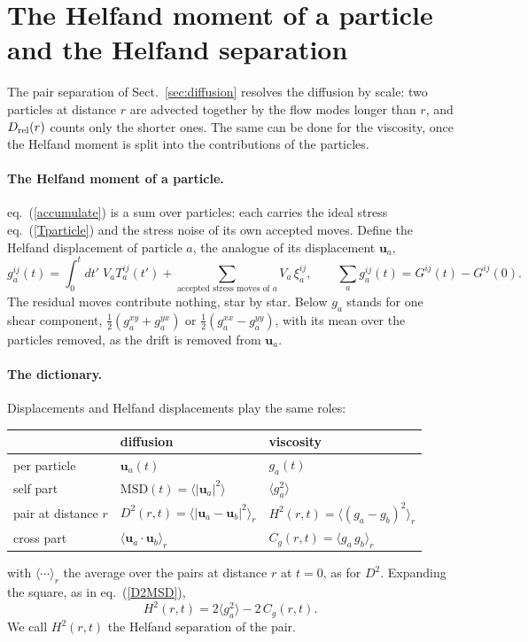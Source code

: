 \documentclass[11pt,aps,preprint,nofootinbib,superscriptaddress,tightenlines]{revtex4-2}
\def\st{\begin{equation}}
\def\stp{\end{equation}}
\def\Eq#1{eq.~(\ref{#1})}
\def\Sect#1{Sect.~\ref{#1}}
\newcommand{\avg}[1]{\langle #1\rangle}
\let\oldparagraph\paragraph
\renewcommand{\paragraph}{\par\bigskip\oldparagraph}
\begin{document}
\section{The Helfand moment of a particle and the Helfand separation}
\label{sec:hsep}

The pair separation of \Sect{sec:diffusion} resolves the diffusion by scale: two particles at distance $r$ are advected together by
the flow modes longer than $r$, and $D_{\rm rel}(r)$ counts only the shorter ones.  The same can be done for the viscosity, once the
Helfand moment is split into the contributions of the particles.

\paragraph{The Helfand moment of a particle.}  \Eq{accumulate} is a sum over particles: each carries the ideal stress \Eq{Tparticle}
and the stress noise of its own accepted moves.  Define the Helfand displacement of particle $a$, the analogue of its displacement $\bm u_a$,
\st
g_a^{ij}(t)=\int_0^tdt'\;V_aT_a^{ij}(t')+\sum_{\text{accepted stress moves of }a}V_a\,\xi_a^{ij},
\qquad \sum_ag_a^{ij}(t)=G^{ij}(t)-G^{ij}(0) .
\label{ga}
\stp
The residual moves contribute nothing, star by star.  Below $g_a$ stands for one shear component, $\frac12(g_a^{xy}+g_a^{yx})$ or
$\frac12(g_a^{xx}-g_a^{yy})$, with its mean over the particles removed, as the drift is removed from $\bm u_a$.

\paragraph{The dictionary.}  Displacements and Helfand displacements play the same roles:
\begin{center}
\begin{tabular}{lll}
\hline
 & diffusion & viscosity \\ \hline
per particle & $\bm u_a(t)$ & $g_a(t)$ \\
self part & $\mathrm{MSD}(t)=\avg{|\bm u_a|^2}$ & $\avg{g_a^2}$ \\
pair at distance $r$ & $D^2(r,t)=\avg{|\bm u_a-\bm u_b|^2}_r$ & $H^2(r,t)=\avg{(g_a-g_b)^2}_r$ \\
cross part & $\avg{\bm u_a\cdot\bm u_b}_r$ & $C_g(r,t)=\avg{g_a\,g_b}_r$ \\
\hline
\end{tabular}
\end{center}
with $\avg{\cdots}_r$ the average over the pairs at distance $r$ at $t=0$, as for $D^2$.  Expanding the square, as in \Eq{D2MSD},
\st
H^2(r,t)=2\avg{g_a^2}-2\,C_g(r,t) .
\label{H2}
\stp
We call $H^2(r,t)$ the Helfand separation of the pair.
\end{document}
